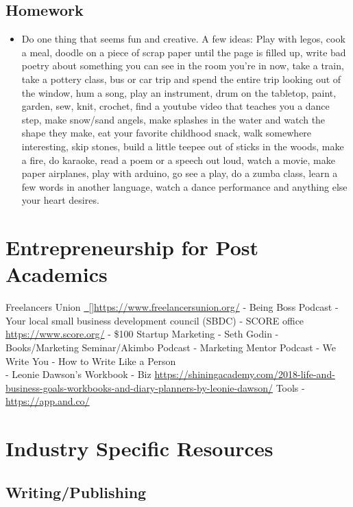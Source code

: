 \documentclass[]{book}
\providecommand{\tightlist}{%
  \setlength{\itemsep}{0pt}\setlength{\parskip}{0pt}}
\theoremstyle{definition}
\theoremstyle{definition}
\theoremstyle{definition}
\theoremstyle{remark}
\begin{document}
\section{Homework}\label{homework-3}

\begin{itemize}
\tightlist
\item
  Do one thing that seems fun and creative. A few ideas: Play with
  legos, cook a meal, doodle on a piece of scrap paper until the page is
  filled up, write bad poetry about something you can see in the room
  you're in now, take a train, take a pottery class, bus or car trip and
  spend the entire trip looking out of the window, hum a song, play an
  instrument, drum on the tabletop, paint, garden, sew, knit, crochet,
  find a youtube video that teaches you a dance step, make snow/sand
  angels, make splashes in the water and watch the shape they make, eat
  your favorite childhood snack, walk somewhere interesting, skip
  stones, build a little teepee out of sticks in the woods, make a fire,
  do karaoke, read a poem or a speech out loud, watch a movie, make
  paper airplanes, play with arduino, go see a play, do a zumba class,
  learn a few words in another language, watch a dance performance and
  anything else your heart desires.
\end{itemize}

\chapter{Entrepreneurship for Post
Academics}\label{entrepreneurship-for-post-academics}

Freelancers Union
\href{https://www.freelancersunion.org/}{~{[}{]}https://www.freelancersunion.org/}
- Being Boss Podcast - Your local small business development council
(SBDC) - SCORE office \url{https://www.score.org/} - \$100 Startup
Marketing - Seth Godin - Books/Marketing Seminar/Akimbo Podcast -
Marketing Mentor Podcast - We Write You - How to Write Like a Person\\
- Leonie Dawson's Workbook - Biz
\url{https://shiningacademy.com/2018-life-and-business-goals-workbooks-and-diary-planners-by-leonie-dawson/}
Tools - \url{https://app.and.co/}

\chapter{Industry Specific Resources}\label{industry-specific-resources}

\section{Writing/Publishing}\label{writingpublishing}
\end{document}
